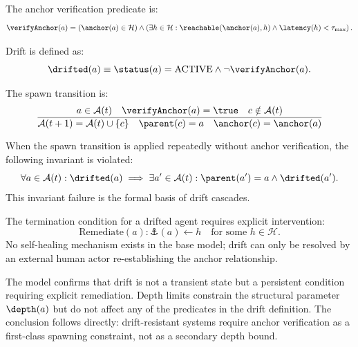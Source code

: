 The anchor verification predicate is:
\[
\verifyAnchor(a) = \left(\anchor(a) \in \mathcal{H}\right) \land \left(\exists h \in \mathcal{H}: \reachable(\anchor(a), h) \land \latency(h) < \tau_{\max}\right).
\]

Drift is defined as:
\[
\drifted(a) \equiv \status(a) = \text{ACTIVE} \land \neg \verifyAnchor(a).
\]

The spawn transition is:
\[
\frac{a \in \mathcal{A}(t) \quad \verifyAnchor(a) = \true \quad c \notin \mathcal{A}(t)}
     {\mathcal{A}(t+1) = \mathcal{A}(t) \cup \{c\} \quad \parent(c) = a \quad \anchor(c) = \anchor(a)}
\]

When the spawn transition is applied repeatedly without anchor verification, the following invariant is violated:
\[
\forall a \in \mathcal{A}(t): \drifted(a) \implies \exists a' \in \mathcal{A}(t): \parent(a') = a \land \drifted(a').
\]
This invariant failure is the formal basis of drift cascades.

The termination condition for a drifted agent requires explicit intervention:
\[
\text{Remediate}(a): \anchor(a) \leftarrow h \quad \text{for some } h \in \mathcal{H}.
\]
No self-healing mechanism exists in the base model; drift can only be resolved by an external human actor re-establishing the anchor relationship.

The model confirms that drift is not a transient state but a persistent condition requiring explicit remediation. Depth limits constrain the structural parameter $\depth(a)$ but do not affect any of the predicates in the drift definition. The conclusion follows directly: drift-resistant systems require anchor verification as a first-class spawning constraint, not as a secondary depth bound.